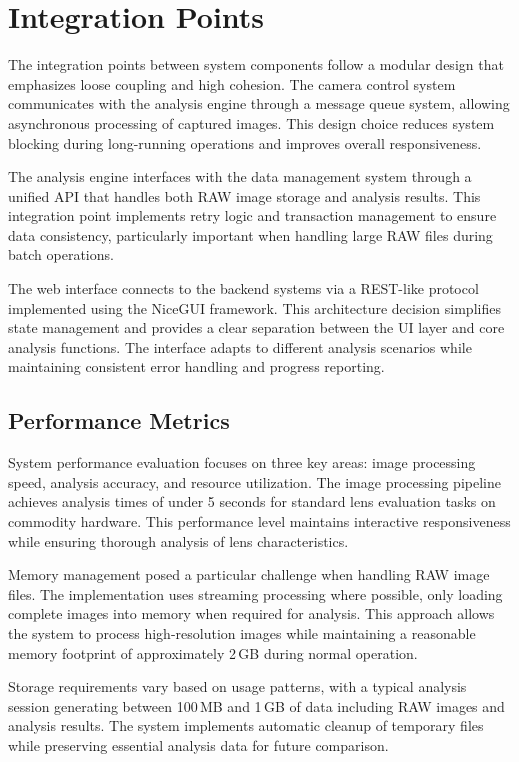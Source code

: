 \section{Integration Points}

The integration points between system components follow a modular design that emphasizes loose coupling and high cohesion. The camera control system communicates with the analysis engine through a message queue system, allowing asynchronous processing of captured images. This design choice reduces system blocking during long-running operations and improves overall responsiveness.

The analysis engine interfaces with the data management system through a unified API that handles both RAW image storage and analysis results. This integration point implements retry logic and transaction management to ensure data consistency, particularly important when handling large RAW files during batch operations.

The web interface connects to the backend systems via a REST-like protocol implemented using the NiceGUI framework. This architecture decision simplifies state management and provides a clear separation between the UI layer and core analysis functions. The interface adapts to different analysis scenarios while maintaining consistent error handling and progress reporting.

\subsection{Performance Metrics}
System performance evaluation focuses on three key areas: image processing speed, analysis accuracy, and resource utilization. The image processing pipeline achieves analysis times of under 5 seconds for standard lens evaluation tasks on commodity hardware. This performance level maintains interactive responsiveness while ensuring thorough analysis of lens characteristics.

Memory management posed a particular challenge when handling RAW image files. The implementation uses streaming processing where possible, only loading complete images into memory when required for analysis. This approach allows the system to process high-resolution images while maintaining a reasonable memory footprint of approximately 2\,GB during normal operation.

Storage requirements vary based on usage patterns, with a typical analysis session generating between 100\,MB and 1\,GB of data including RAW images and analysis results. The system implements automatic cleanup of temporary files while preserving essential analysis data for future comparison.

